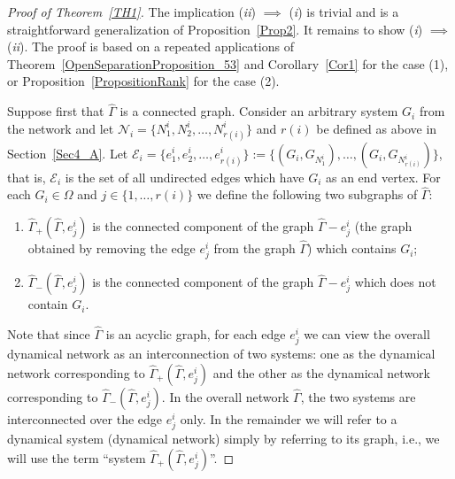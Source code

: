 \documentclass[11pt,a4paper,oneside,DIV=12,headings=small]{scrartcl}
\theoremstyle{plain}
\begin{document}
\medskip
\begin{proof}[Proof of Theorem~\ref{TH1}]The implication (\emph{ii}) $\implies$ (\emph{i}) is trivial and is a straightforward generalization of Proposition~\ref{Prop2}. It remains to show (\emph{i}) $\implies$ (\emph{ii}). The proof is based on a repeated applications of Theorem~\ref{OpenSeparationProposition_53} and Corollary~\ref{Cor1} for the case (1), or Proposition~\ref{PropositionRank} for the case (2). 

Suppose first that $\hat{\Gamma}$ is a connected graph.
Consider an arbitrary system $G_i$ from the network and let $\mathcal{N}_i=\{N_1^i,N_2^i,\ldots,N_{r(i)}^i\}$ and $r(i)$ be defined as above in Section~\ref{Sec4_A}. Let $\mathcal{E}_i=\{e_1^i,e_2^i,\ldots,e_{r(i)}^i\}:=\{(G_i,G_{N_1^i}),\ldots,(G_i,G_{N_{r(i)}^i})\}$, that is, $\mathcal{E}_i$ is the set of all undirected edges which have $G_i$ as an end vertex. For each $G_i \in \Omega$ and $j \in \{1, \ldots,r(i)\}$ we define the following two subgraphs of $\hat{\Gamma}$:
\begin{enumerate}
\item[i)] $\hat{\Gamma}_+(\hat{\Gamma},e^i_j)$ is the connected component of the graph $\hat\Gamma - e_j^i$ (the graph obtained by removing the edge $e_j^i$ from the graph $\hat\Gamma$) which contains $G_i$;
\item[ii)] $\hat{\Gamma}_-(\hat{\Gamma},e^i_j)$ is the connected component of the graph $\hat\Gamma - e_j^i$ which does not contain $G_i$.
\end{enumerate}
Note that since $\hat{\Gamma}$ is an acyclic graph, for each edge $e^i_j$ we can view the overall dynamical network as an interconnection of two systems: one as the dynamical network corresponding to $\hat{\Gamma}_+(\hat{\Gamma},e^i_j)$ and the other as the dynamical network corresponding to $\hat{\Gamma}_-(\hat{\Gamma},e^i_j)$.   
In the overall network $\hat{\Gamma}$, the two systems are interconnected over the edge $e^i_j$ only. In the remainder we will refer to a dynamical system (dynamical network) simply by referring to its graph, i.e., we will use the term ``system $\hat{\Gamma}_+(\hat{\Gamma},e^i_j)$''. 


\end{proof}
\end{document}
